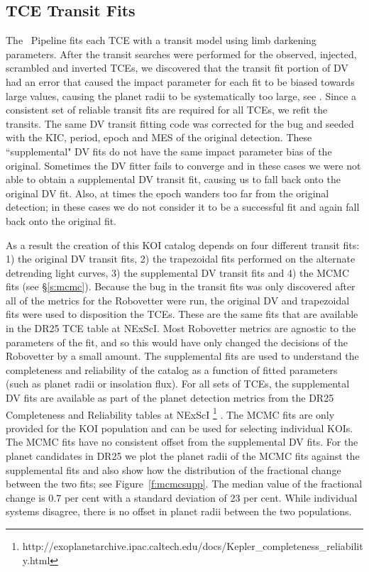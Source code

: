 \subsection{TCE Transit Fits}

The \Kepler\ Pipeline fits each TCE with a \citet{Mandel2002} transit model using \citet{Claret2000} limb darkening parameters. After the transit searches were performed for the observed, injected, scrambled and inverted TCEs, we discovered that the transit fit portion of DV had an error that caused the impact parameter for each fit to be biased towards large values, causing the planet radii to be systematically too large, see \citet{KSCI19110}. Since a consistent set of reliable transit fits are required for all TCEs, we refit the transits.  The same DV transit fitting code was corrected for the bug and seeded with the KIC, period, epoch and MES of the original detection. These ``supplemental" DV fits do not have the same impact parameter bias of the original.  Sometimes the DV fitter fails to converge and in these cases we were not able to obtain a supplemental DV transit fit, causing us to fall back onto the original DV fit. Also, at times the epoch wanders too far from the original detection; in these cases we do not consider it to be a successful fit and again fall back onto the original fit.

As a result the creation of this KOI catalog depends on four different transit fits: 1) the original DV transit fits, 2) the trapezoidal fits performed on the alternate detrending light curves, 3) the supplemental DV transit fits and 4) the MCMC fits (see \S\ref{s:mcmc}).  Because the bug in the transit fits was only discovered after all of the metrics for the Robovetter were run, the original DV and trapezoidal fits were used to disposition the TCEs. These are the same fits that are available in the DR25 TCE table at NExScI.  Most Robovetter metrics are agnostic to the parameters of the fit, and so this would have only changed the decisions of the Robovetter by a small amount.  The supplemental fits are used to understand the completeness and reliability of the catalog as a function of fitted parameters (such as planet radii or insolation flux).  For all sets of TCEs, the supplemental DV fits are available as part of the planet detection metrics from the DR25 Completeness and Reliability tables at NExScI \footnote{http://exoplanetarchive.ipac.caltech.edu/docs/Kepler\_completeness\_reliability.html}  \citep{KSCI19110,KSCI19114}. The MCMC fits are only provided for the KOI population and can be used for selecting individual KOIs. The MCMC fits have no consistent offset from the supplemental DV fits.  For the planet candidates in DR25 we plot the planet radii of the MCMC fits against the supplemental fits and also show how the distribution of the fractional change between the two fits; see Figure~\ref{f:mcmcsupp}. The median value of the fractional change is 0.7 per cent with a standard deviation of 23 per cent. While individual systems disagree, there is no offset in planet radii between the two populations.  

